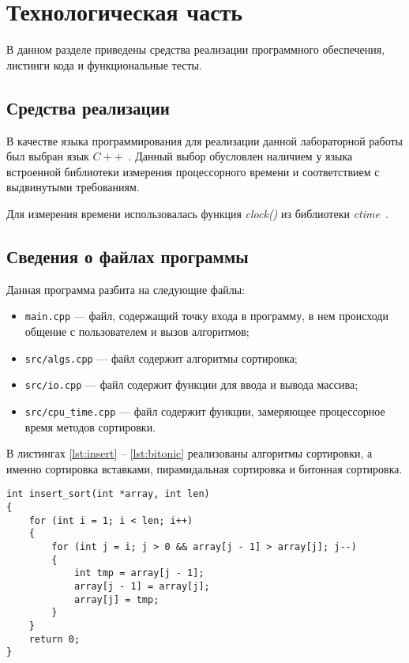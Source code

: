 \chapter{Технологическая часть}

В данном разделе приведены средства реализации программного обеспечения, листинги кода и функциональные тесты.

\section{Средства реализации}

В качестве языка программирования для реализации данной лабораторной работы был выбран язык $C++$~\cite{cpp-lang}.
Данный выбор обусловлен наличием у языка встроенной библиотеки измерения процессорного времени и соответствием с выдвинутыми требованиям.

Для измерения времени использовалась функция \textit{clock()} из библиотеки \textit{ctime}~\cite{cpp-lang-time}.

\clearpage

\section{Сведения о файлах программы}

Данная программа разбита на следующие файлы:

\begin{itemize}[label=---]
	\item \texttt{main.cpp} --- файл, содержащий точку входа в программу, в нем происходи общение с пользователем и вызов алгоритмов;
	\item \texttt{src/algs.cpp} --- файл содержит алгоритмы сортировка;
	\item \texttt{src/io.cpp} --- файл содержит функции для ввода и вывода массива;
	\item \texttt{src/cpu\_time.cpp} --- файл содержит функции, замеряющее процессорное время методов сортировки.
\end{itemize}

В листингах \ref{lst:insert} -- \ref{lst:bitonic} реализованы алгоритмы сортировки, а именно сортировка вставками, пирамидальная сортировка и битонная сортировка.

\clearpage

\begin{lstlisting}[label=lst:insert,caption=Функция сортировки вставками]
int insert_sort(int *array, int len)
{
	for (int i = 1; i < len; i++)
	{
		for (int j = i; j > 0 && array[j - 1] > array[j]; j--)
		{
			int tmp = array[j - 1];
			array[j - 1] = array[j];
			array[j] = tmp;
		}
	}
	return 0;
}
\end{lstlisting}

